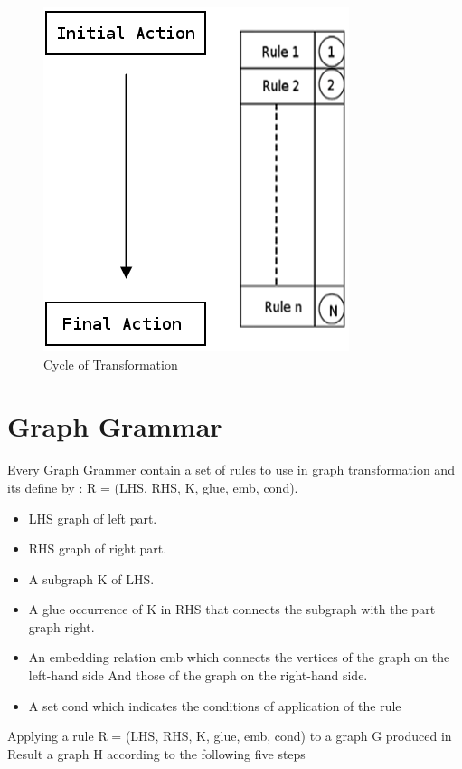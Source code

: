 \vspace{0.5cm}
\begin{figure}[th]
	\centering
		\includegraphics[scale=0.52]{ch3/img/transGrammar}
	\caption{\label{fig:Cycle of Tranformation}Cycle of Transformation\cite{ch3-img}}
\end{figure} 

\pagebreak
\section{Graph Grammar} 
Every Graph Grammer contain a set of rules to use in graph transformation
and its define by\cite{ch3-doc, ch3-spec} :
R = (LHS, RHS, K, glue, emb, cond). 
\begin{itemize}
\newcommand{\localtextbulletone}{\textcolor{gray}{\raisebox{.45ex}{\rule{.6ex}{.6ex}}}}
\renewcommand{\labelitemi}{\localtextbulletone}
\item LHS graph of left part.
\item RHS graph of right part.
\item A subgraph K of LHS.
\item A glue occurrence of K in RHS that connects the subgraph with the part graph right.
\item An embedding relation emb which connects the vertices of the graph on the left-hand side
And those of the graph on the right-hand side.
\item A set cond which indicates the conditions of application of the rule
\end{itemize}

Applying a rule R = (LHS, RHS, K, glue, emb, cond) to a graph G produced in
Result a graph H according to the following five steps

